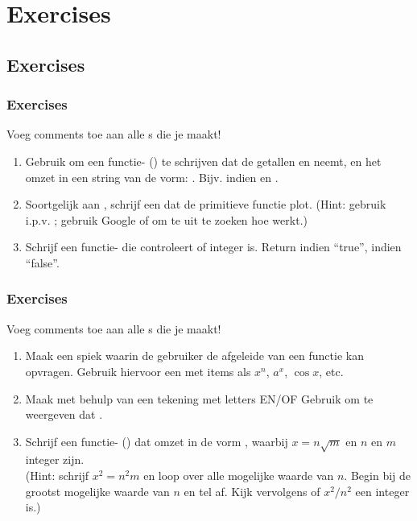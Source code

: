 \section{Exercises}
\subsection{Exercises}

\begin{frame}
\frametitle{Exercises}

Voeg comments toe aan alle s die je maakt!
\begin{enumerate}
  \item Gebruik  om een functie- () te schrijven dat de getallen  en  neemt,
  		en het omzet in een string van de vorm: . Bijv.  indien  en .
  \item Soortgelijk aan , schrijf een  dat de primitieve functie plot.
  		(Hint: gebruik  i.p.v. ; gebruik Google of  om te uit te zoeken hoe  werkt.)
  \item Schrijf een functie-  die controleert of  integer is. Return  indien ``true'',  indien ``false''.
\end{enumerate}


\end{frame}

\begin{frame}
\frametitle{Exercises}

Voeg comments toe aan alle s die je maakt!
\begin{enumerate}
  \item Maak een spiek waarin de gebruiker de afgeleide van een functie kan opvragen. Gebruik hiervoor een  met items als $x^n$, $a^x$, $\cos{x}$, etc.
  \item Maak met behulp van  een tekening met letters EN/OF Gebruik  om te weergeven dat .
  \item Schrijf een functie- () dat  omzet in de vorm , waarbij $x=n\sqrt{m}$ en $n$ en $m$ integer zijn.\\%
  		(Hint: schrijf $x^2=n^2m$ en loop over alle mogelijke waarde van $n$. Begin bij de grootst mogelijke waarde van $n$ en tel af. Kijk vervolgens of $x^2/n^2$ een integer is.)
\end{enumerate}


\end{frame}

